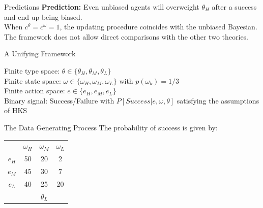 \documentclass[aspectratio=169]{beamer}
\begin{document}

\begin{frame}{Predictions}
    \textbf{Prediction:} Even unbiased agents will overweight $\theta_H$ after a success and end up being biased.\\
    \bigskip
    When $c^\theta = c^\omega = 1$, the updating procedure coincides with the unbiased Bayesian.\\
    
    \bigskip
    The framework does not allow direct comparisons with the other two theories.\\
    
    
\end{frame}

\begin{frame}{A Unifying Framework}

Finite type space: $\theta \in \{\theta_H, \theta_M, \theta_L\}$\\
\bigskip
Finite state space: $\omega \in \{\omega_H, \omega_M, \omega_L\}$
with $p(\omega_k)=1/3$ \\
\bigskip
Finite action space: $e \in \{e_H, e_M, e_L\}$\\
\bigskip
Binary signal: Success/Failure with $P\left[Success|e, \omega, \theta\right]$ satisfying the assumptions of HKS


\end{frame}

\begin{frame}{The Data Generating Process}
The probability of success is given by:\\
\bigskip
\centering
\begin{tabular}{ c|c|c|c|}
  
  \multicolumn{1}{c}{} & \multicolumn{1}{c}{$\omega_H$} & \multicolumn{1}{c}{$\omega_M$} & \multicolumn{1}{c}{$\omega_L$}\\
  \cline{2-4}
  $e_H$ & 50 & 20 & 2 \\
  \cline{2-4}
  $e_M$ & 45 & 30 & 7 \\
  \cline{2-4}
  $e_L$ & 40 & 25 & 20 \\
  \cline{2-4}
  \multicolumn{1}{c}{} & \multicolumn{1}{c}{} & \multicolumn{1}{c}{$\theta_L$} & \multicolumn{1}{c}{}\\
\end{tabular}
\hspace{.3cm} %
\begin{tabular}{ c|c|c|c|}
  

\end{tabular}
\end{frame}
\end{document}
\end{frame}
\end{document}
\end{frame}
\end{document}
